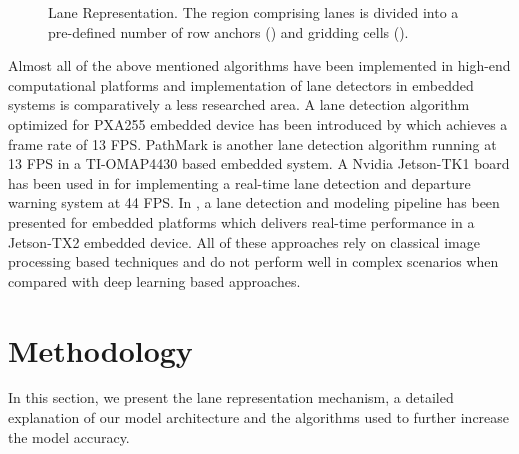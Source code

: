 \documentclass[conference]{IEEEtran}
\begin{document}
\begin{figure}
 \caption{Lane Representation. The region comprising lanes is divided into a pre-defined number of row anchors () and gridding cells ().}
    \vspace{-0.3cm}
    \label{fig:lane_rep}
\end{figure}

Almost all of the above mentioned algorithms have been implemented in high-end computational platforms and implementation of lane detectors in embedded systems is comparatively a less researched area. A lane detection algorithm optimized for PXA255 embedded device has been introduced by \cite{Ming07real} which achieves a frame rate of 13 FPS. PathMark \cite{pathmark} is another lane detection algorithm running at 13 FPS in a TI-OMAP4430 based embedded system. A Nvidia Jetson-TK1 board has been used in \cite{lanedeparture} for implementing a real-time lane detection and departure warning system at 44 FPS. In \cite{marcos18fast}, a lane detection and modeling pipeline has been presented for embedded platforms which delivers real-time performance in a Jetson-TX2 embedded device. All of these approaches rely on classical image processing based techniques and do not perform well in complex scenarios when compared with deep learning based approaches. 




\section{Methodology}
\label{sec:method}
In this section, we present the lane representation mechanism, a detailed explanation of our model architecture and the algorithms used to further increase the model accuracy.
\end{document}
